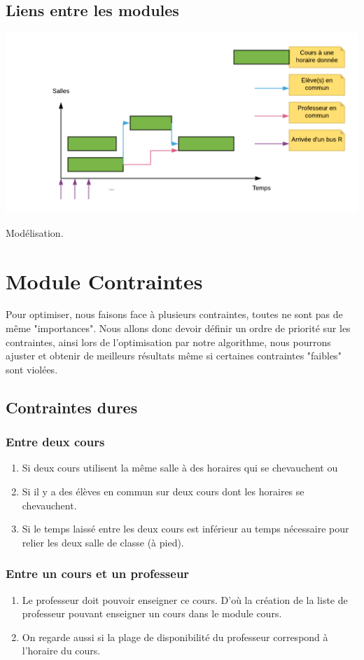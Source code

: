 \documentclass[a4paper,11pt]{article}
\begin{document}
	\subsection{Liens entre les modules}
		\centerline{\includegraphics[scale=0.5]{modelter.png}}
		Modélisation.\\

\section{Module Contraintes}
	Pour optimiser, nous faisons face à plusieurs contraintes, toutes ne sont pas 
	de même "importances". Nous allons donc devoir définir un ordre de priorité sur 
	les contraintes, ainsi lors de l'optimisation par notre algorithme, nous 
	pourrons ajuster et obtenir de meilleurs résultats même si certaines contraintes
	"faibles" sont violées.\\
	\subsection{Contraintes dures}
			\subsubsection{Entre deux cours}
				\begin{enumerate}
					\item Si deux cours utilisent la même salle à des horaires qui se chevauchent ou
					\item Si il y a des élèves en commun sur deux cours dont les horaires se chevauchent.
					\item Si le temps laissé entre les deux cours est inférieur au temps nécessaire pour relier les deux salle de classe (à pied).
				\end{enumerate}
			\subsubsection{Entre un cours et un professeur}
				\begin{enumerate}
					\item Le professeur doit pouvoir enseigner ce cours. D'où la création de la liste de professeur pouvant enseigner un cours dans le module cours.
					\item 	On regarde aussi si la plage de disponibilité du professeur correspond à l'horaire du cours.
				\end{enumerate}
\end{document}
